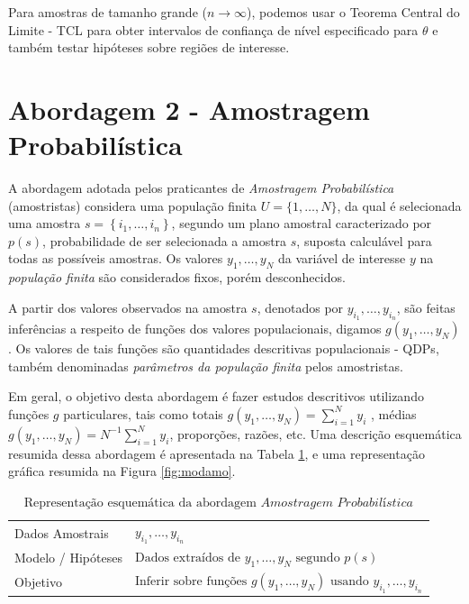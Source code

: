 \documentclass[
  12pt,
  brazilian,
]{book}
\theoremstyle{definition}
\theoremstyle{definition}
\theoremstyle{definition}
\theoremstyle{definition}
\theoremstyle{remark}
\begin{document}
Para amostras de tamanho grande (\(n \rightarrow \infty\)), podemos usar o Teorema Central do Limite - TCL para obter intervalos de confiança de nível especificado para \(\theta\) e também testar hipóteses sobre regiões de interesse.

\hypertarget{abordagem-2---amostragem-probabiluxedstica}{%
\section{Abordagem 2 - Amostragem Probabilística}\label{abordagem-2---amostragem-probabiluxedstica}}

A abordagem adotada pelos praticantes de \emph{Amostragem Probabilística}
(amostristas) considera uma população finita \(U=\{1, \ldots ,N\}\), da qual é
selecionada uma amostra \(s=\left\{ i_{1}, \ldots ,i_{n}\right\}\), segundo um
plano amostral caracterizado por \(p(s)\), probabilidade de ser
selecionada a amostra \(s\), suposta calculável para todas as possíveis amostras.
Os valores \(y_{1}, \ldots ,y_{N}\) da variável de interesse \(y\) na \emph{população finita} são considerados fixos, porém desconhecidos.

A partir dos valores observados na amostra \(s\), denotados por \(y_{i_1}, \ldots, y_{i_n}\), são feitas inferências a respeito de funções dos valores populacionais, digamos \(g\left( y_{1}, \ldots , y_{N}\right)\). Os valores de tais funções são quantidades descritivas populacionais - QDPs, também denominadas \emph{parâmetros da população finita} pelos amostristas.

Em geral, o objetivo desta abordagem é fazer estudos descritivos utilizando funções \(g\) particulares, tais como totais \(g\left( y_{1}, \ldots , y_{N}\right) = \sum_{i=1}^{N} y_{i}\) , médias \(g\left( y_{1}, \ldots , y_{N}\right) = N^{-1}\sum_{i=1}^{N} y_{i}\), proporções, razões, etc. Uma descrição esquemática resumida dessa abordagem é apresentada na Tabela \ref{tab:modelamo}, e uma representação gráfica resumida na Figura \ref{fig:modamo}.

\begin{table}[H]

\caption{\label{tab:modelamo}$\text{Representação esquemática da abordagem }\textit{Amostragem Probabilística}$}
\centering
\begin{tabular}[t]{>{\raggedright\arraybackslash}p{4.5cm}l}
\toprule
Dados Amostrais & $y_{i_1}, \ldots, y_{i_n}$\\
Modelo / Hipóteses & $\text{Dados extraídos de }y_1,\ldots, y_N \text{ segundo }p(s)$\\
Objetivo & $\text{Inferir sobre funções }g(y_1, \ldots , y_N)\text{ usando }y_{i_1}, \ldots, y_{i_n}$\\
\bottomrule
\end{tabular}
\end{table}
\end{document}

